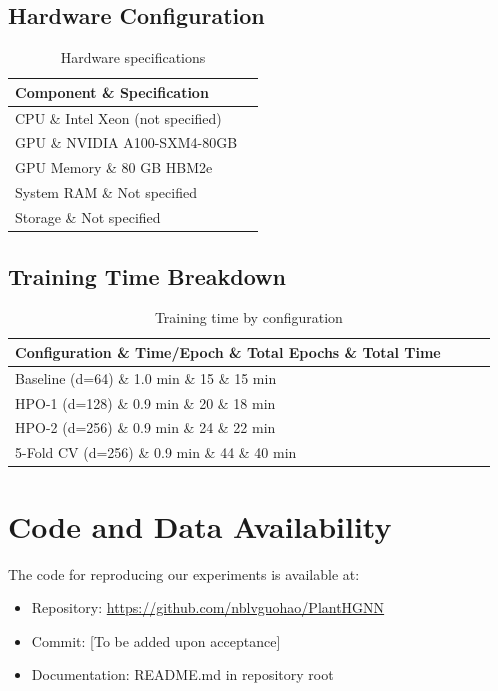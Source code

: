 \documentclass[11pt,a4paper]{article}
\begin{document}
\subsection{Hardware Configuration}
\label{subsec:hardware}

\begin{table}[H]
\centering
\caption{Hardware specifications}
\label{tab:hardware}
\begin{tabular}{ll}
\toprule
\textbf{Component} \& \textbf{Specification} \\
\midrule
CPU \& Intel Xeon (not specified) \\
GPU \& NVIDIA A100-SXM4-80GB \\
GPU Memory \& 80 GB HBM2e \\
System RAM \& Not specified \\
Storage \& Not specified \\
\bottomrule
\end{tabular}
\end{table}

\subsection{Training Time Breakdown}
\label{subsec:time_breakdown}

\begin{table}[H]
\centering
\caption{Training time by configuration}
\label{tab:time_breakdown}
\begin{tabular}{lccc}
\toprule
\textbf{Configuration} \& \textbf{Time/Epoch} \& \textbf{Total Epochs} \& \textbf{Total Time} \\
\midrule
Baseline (d=64) \& 1.0 min \& 15 \& 15 min \\
HPO-1 (d=128) \& 0.9 min \& 20 \& 18 min \\
HPO-2 (d=256) \& 0.9 min \& 24 \& 22 min \\
5-Fold CV (d=256) \& 0.9 min \& 44 \& 40 min \\
\bottomrule
\end{tabular}
\end{table}

\section{Code and Data Availability}
\label{sec:code}

The code for reproducing our experiments is available at:
\begin{itemize}
\item Repository: \url{https://github.com/nblvguohao/PlantHGNN}
\item Commit: [To be added upon acceptance]
\item Documentation: README.md in repository root
\end{itemize}
\end{document}
